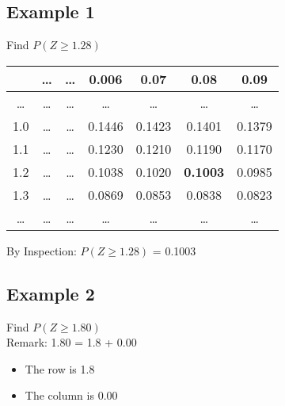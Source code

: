 \subsection*{Example 1}
Find $ P(Z \geq 1.28)$
{
\begin{table}[ht]


\centering %
\begin{tabular}{|c|| c c c c |c| c|} %
\hline %
& \ldots & \ldots & 0.006 &0.07&0.08&0.09 \\
\hline \hline%
\ldots & \ldots & \ldots &\ldots& \ldots &\ldots&\dots \\ %
1.0 & \ldots & \ldots &0.1446& 0.1423 &0.1401&0.1379 \\ %
1.1 & \ldots & \ldots&0.1230& 0.1210 &0.1190&0.1170 \\ %
\hline
1.2 & \ldots & \ldots&0.1038 & 0.1020 &\textbf{0.1003}&0.0985\\
\hline
1.3 & \ldots & \ldots &0.0869& 0.0853 &0.0838&0.0823 \\ %
\ldots & \ldots &\ldots&\ldots & \ldots &\ldots&\ldots\\
\hline %
\end{tabular}
\end{table}
}

\noindent By Inspection: $ P(Z \geq 1.28)$ = 0.1003

\subsection*{Example 2}

Find  $P(Z \geq 1.80)$\\

Remark:  1.80 = 1.8 + 0.00
\begin{itemize}
\item The row is 1.8
\item The column is 0.00
\end{itemize}

